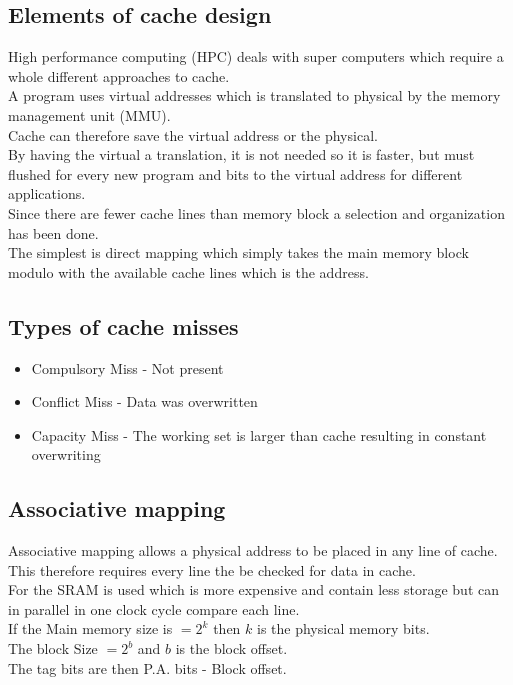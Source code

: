 \documentclass[12pt, a4paper]{article}
\begin{document}
		\subsection{Elements of cache design}
			High performance computing (HPC) deals with super computers which require a whole different approaches to cache.\\
			A program uses virtual addresses which is translated to physical by the memory management unit (MMU).\\
			Cache can therefore save the virtual address or the physical.\\
			By having the virtual a translation, it is not needed so it is faster, but must flushed for every new program and bits to the virtual address for different applications.\\
			Since there are fewer cache lines than memory block a selection and organization has been done.\\
			The simplest is direct mapping which simply takes the main memory block modulo with the available cache lines which is the address.
		\subsection{Types of cache misses}
			\begin{itemize}
				\item Compulsory Miss - Not present
				\item Conflict Miss - Data was overwritten
				\item Capacity Miss - The working set is larger than cache resulting in constant overwriting
			\end{itemize}
		\subsection{Associative mapping}
			Associative mapping allows a physical address to be placed in any line of cache.\\
			This therefore requires every line the be checked for data in cache.\\
			For the SRAM is used which is more expensive and contain less storage but can in parallel in one clock cycle compare each line.\\
			If the Main memory size is $=2^k$ then $k$ is the physical memory bits.\\
			The block Size $=2^b$ and $b$ is the block offset.\\
			The tag bits are then P.A. bits - Block offset.
\end{document}
